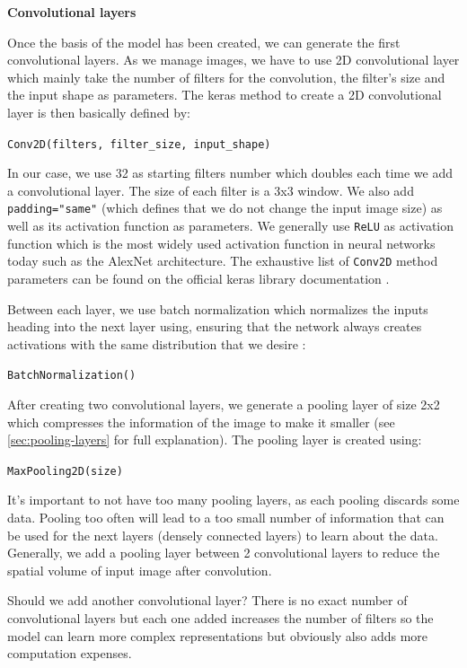 \documentclass[11pt, openany]{report}
\theoremstyle{plain}
\theoremstyle{definition}
\theoremstyle{remark}
\begin{document}
\textbf{Convolutional layers}

Once the basis of the model has been created, we can generate the first convolutional layers. As we manage images, we have to use 2D convolutional layer which mainly take the number of filters for the convolution, the filter's size and the input shape as parameters. The keras method to create a 2D convolutional layer is then basically defined by:
\begin{center}
\texttt{Conv2D(filters, filter\_size, input\_shape)}
\end{center}
In our case, we use 32 as starting filters number which doubles each time we add a convolutional layer. The size of each filter is a 3x3 window. We also add \texttt{padding="same"} (which defines that we do not change the input image size) as well as its activation function as parameters. We generally use \texttt{ReLU} as activation function which is the most widely used activation function in neural networks today such as the AlexNet architecture. The exhaustive list of \texttt{Conv2D} method parameters can be found on the official keras library documentation \cite{keras-doc}. 

Between each layer, we use batch normalization which normalizes the inputs heading into the next layer using, ensuring that the network always creates activations with the same distribution that we desire \cite{CIFAR10-implementation-2}: 
\begin{center}
\texttt{BatchNormalization()}
\end{center}

After creating two convolutional layers, we generate a pooling layer of size 2x2 which compresses the information of the image to make it smaller (see \autoref{sec:pooling-layers} for full explanation). The pooling layer is created using: 
\begin{center}
\texttt{MaxPooling2D(size)}
\end{center}
It's important to not have too many pooling layers, as each pooling discards some data. Pooling too often will lead to a too small number of information that can be used for the next layers (densely connected layers) to learn about the data. Generally, we add a pooling layer between 2 convolutional layers to reduce the spatial volume of input image after convolution. 

Should we add another convolutional layer? There is no exact number of convolutional layers but each one added increases the number of filters so the model can learn more complex representations but obviously also adds more computation expenses. 
\end{document}
